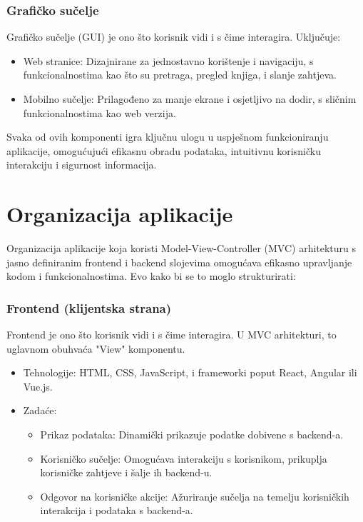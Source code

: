  \subsubsection{Grafičko sučelje}

Grafičko sučelje (GUI) je ono što korisnik vidi i s čime interagira. Uključuje:
\begin{itemize}
		  \item {Web stranice: Dizajnirane za jednostavno korištenje i navigaciju, s funkcionalnostima kao što su pretraga, pregled knjiga, i slanje zahtjeva.}
		  \item {Mobilno sučelje: Prilagođeno za manje ekrane i osjetljivo na dodir, s sličnim funkcionalnostima kao web verzija.}	\\
	   \end{itemize} 

Svaka od ovih komponenti igra ključnu ulogu u uspješnom funkcioniranju aplikacije, omogućujući efikasnu obradu podataka, intuitivnu korisničku interakciju i sigurnost informacija.

\eject

\section{Organizacija aplikacije}

Organizacija aplikacije koja koristi Model-View-Controller (MVC) arhitekturu s jasno definiranim frontend i backend slojevima omogućava efikasno upravljanje kodom i funkcionalnostima. Evo kako bi se to moglo strukturirati:

 \subsubsection{Frontend (klijentska strana)}

Frontend je ono što korisnik vidi i s čime interagira. U MVC arhitekturi, to uglavnom obuhvaća "View" komponentu.
\begin{itemize}
		  \item {Tehnologije: HTML, CSS, JavaScript, i frameworki poput React, Angular ili Vue.js.}
		  \item {Zadaće:
    \begin{itemize}
		  \item {Prikaz podataka: Dinamički prikazuje podatke dobivene s backend-a.}
		  \item {Korisničko sučelje: Omogućava interakciju s korisnikom, prikuplja korisničke zahtjeve i šalje ih backend-u.}	
            \item {Odgovor na korisničke akcije: Ažuriranje sučelja na temelju korisničkih interakcija i podataka s backend-a.} \\
	   \end{itemize}}	
            
	   \end{itemize}


